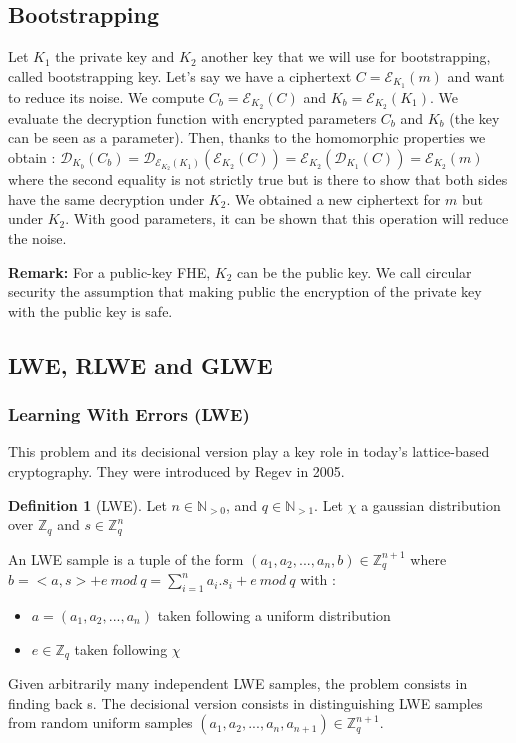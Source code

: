 \documentclass{article}
\newcommand{\Z}{\mathbb{Z}}
\newcommand{\N}{\mathbb{N}}
\theoremstyle{definition}
\newtheorem{definition}{Definition}[section]
\theoremstyle{Theorem}
\begin{document}
\subsection{Bootstrapping} \label{introbootstrap}
Let $K_1$ the private key and $K_2$ another key that we will use for bootstrapping, called bootstrapping key. Let's say we have a ciphertext $C = \mathcal{E}_{K_{1}}(m)$ and want to reduce its noise. We compute $C_b = \mathcal{E}_{K_2}(C)$ and $K_b = \mathcal{E}_{K_2}(K_1)$. We evaluate the decryption function with encrypted parameters $C_b$ and $K_b$ (the key can be seen as a parameter). Then, thanks to the homomorphic properties we obtain : $\mathcal{D}_{K_b}(C_b) = \mathcal{D}_{\mathcal{E}_{K_2}(K_1)}(\mathcal{E}_{K_2}(C)) = \mathcal{E}_{K_2}(\mathcal{D}_{K_1}(C)) = \mathcal{E}_{K_2}(m)$ where the second equality is not strictly true but is there to show that both sides have the same decryption under $K_2$. We obtained a new ciphertext for $m$ but under $K_2$. With good parameters, it can be shown that this operation will reduce the noise. 

\textbf{Remark: }
For a public-key FHE, $K_2$ can be the public key. We call circular security the assumption that making public the encryption of the private key with the public key is safe. 


\subsection{LWE, RLWE and GLWE}

\subsubsection{Learning With Errors (LWE)} \label{LWE}

This problem and its decisional version play a key role in today's lattice-based cryptography. They were introduced by Regev in 2005. 

\begin{definition}[LWE]

Let $n \in \N_{>0}$, and $q\in\N_{>1}$.
Let $\chi$  a gaussian distribution over $\Z_q$ and $s\in \Z_q^n$

An LWE sample is a tuple of the form $(a_1,a_2,...,a_n,b)\in\Z_q^{n+1}$ where $b=<a,s>+e\ mod\ q=\sum_{i=1}^na_i.s_i+e\ mod\ q$ with :

\begin{itemize}
    \item $a=(a_1,a_2,...,a_n)$ taken following a uniform distribution
    \item $e\in\Z_q$ taken following $\chi$
\end{itemize}

Given arbitrarily many independent LWE samples, the problem consists in finding back s. The decisional version consists in distinguishing LWE samples from random uniform samples $(a_1,a_2,...,a_n,a_{n+1})\in\Z_q^{n+1}$.

\end{definition}
\end{document}
